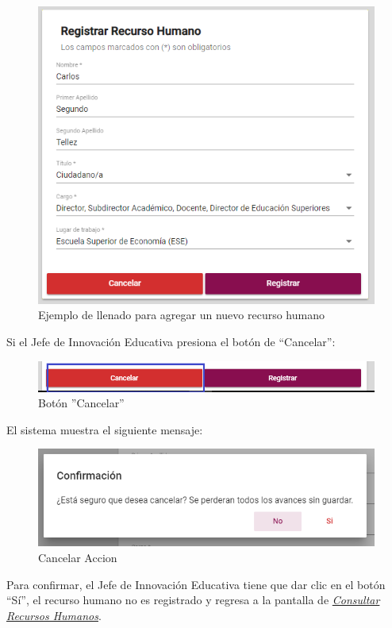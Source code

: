             \begin{figure}[H]
                \centering
                \hypertarget{ejreg}{\includegraphics[width=0.7\linewidth]{images/SP1/RegistrarLleno}}
                \caption{Ejemplo de llenado para agregar un nuevo recurso humano}
                \label{ejreg}
            \end{figure}

    \newpage
            Si el Jefe de Innovación Educativa presiona el botón de “Cancelar”:

            \begin{figure}[H]
                \centering
                \hypertarget{cancel1}{\includegraphics[width=0.7\linewidth]{images/SP1/BtnCancelar1}}
                \caption{Botón ''Cancelar''}
                \label{cancel1}
            \end{figure}

            El sistema muestra el siguiente mensaje:


             \begin{figure}[H]
                \centering
            \includegraphics[width=0.4\linewidth]{images/SP1/MSG29}
                \caption{Cancelar Accion}
                \label{mensaje29}
            \end{figure}

            Para confirmar, el Jefe de Innovación Educativa tiene que dar clic en el botón “Sí”, el recurso humano no es registrado y regresa a la pantalla de \hyperlink{consultarRH}{\textit{Consultar Recursos Humanos}}.

